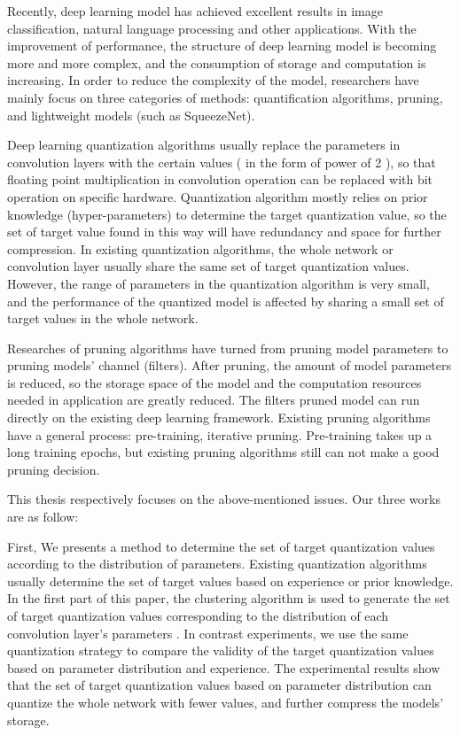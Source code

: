 \documentclass[ pdftex, oneside, master]{NJUthesis}
\begin{document}
\begin{englishabstract}

Recently, deep learning model has achieved excellent results in image classification, natural language processing and other applications. With the improvement of performance, the structure of deep learning model is becoming more and more complex, and the consumption of storage and computation is increasing. In order to reduce the complexity of the model, researchers have mainly focus on three categories of methods: quantification algorithms, pruning, and lightweight models (such as SqueezeNet).

Deep learning quantization algorithms usually replace the parameters in convolution layers with the certain values ( in the form of power of 2 ), so that floating point multiplication in convolution operation can be replaced with bit operation on specific hardware. Quantization algorithm mostly relies on prior knowledge (hyper-parameters) to determine the target quantization value, so the set of target value found in this way will have redundancy and space for further compression. In existing quantization algorithms, the whole network or convolution layer usually share the same set of target quantization values. However, the range of parameters in the quantization algorithm is very small, and the performance of the quantized model is affected by sharing a small set of target values in the whole network.

 Researches of pruning algorithms have turned from pruning model parameters to pruning models' channel (filters). After pruning, the amount of model parameters is reduced, so the storage space of the model and the computation resources needed in application are greatly reduced. The filters pruned model can run directly on the existing deep learning framework. Existing pruning algorithms have a general process: pre-training, iterative pruning. Pre-training takes up a long training epochs, but existing pruning algorithms still can not make a good pruning decision.

This thesis respectively focuses on the above-mentioned issues. Our three works are as follow:


First, We presents a method to determine the set of target quantization values according to the distribution of parameters. Existing quantization algorithms usually determine the set of target values based on experience or prior knowledge. In the first part of this paper, the clustering algorithm is used to generate the set of target quantization values corresponding to the distribution of each convolution layer's parameters . In contrast experiments, we use the same quantization strategy to compare the validity of the target quantization values based on parameter distribution and experience. The experimental results show that the set of target quantization values based on parameter distribution can quantize the whole network with fewer values, and further compress the models' storage.




\end{englishabstract}
\end{document}
